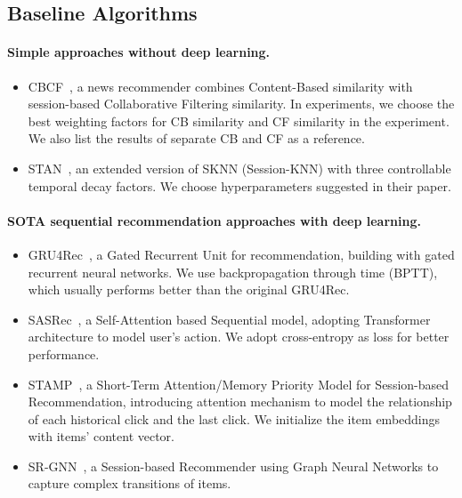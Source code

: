 \subsection{Baseline Algorithms}

\paragraph{Simple approaches without deep learning.}
\begin{itemize}
  \item CBCF~\cite{sottocornola2018session}, a news recommender combines Content-Based similarity with session-based Collaborative Filtering similarity. In experiments, we choose the best weighting factors for CB similarity and CF similarity in the experiment. We also list the results of separate CB and CF as a reference.
  \item STAN~\cite{garg2019sequence}, an extended version of SKNN (Session-KNN) with three controllable temporal decay factors. We choose hyperparameters suggested in their paper.
\end{itemize}

\paragraph{SOTA sequential recommendation approaches with deep learning.}
\begin{itemize}
  \item GRU4Rec~\cite{hidasi2015session,hidasi2018recurrent}, a Gated Recurrent Unit for recommendation, building with gated recurrent neural networks. We use backpropagation through time (BPTT), which usually performs better than the original GRU4Rec.
  \item SASRec~\cite{kang_self-attentive_2018}, a Self-Attention based Sequential model, adopting Transformer architecture to model user's action. We adopt cross-entropy as loss for better performance.
  \item STAMP~\cite{liu2018stamp}, a Short-Term Attention/Memory Priority Model for Session-based Recommendation, introducing attention mechanism to model the relationship of each historical click and the last click. We initialize the item embeddings with items' content vector.
  \item SR-GNN~\cite{wu2019session}, a Session-based Recommender using Graph Neural Networks to capture complex transitions of items.
\end{itemize}

